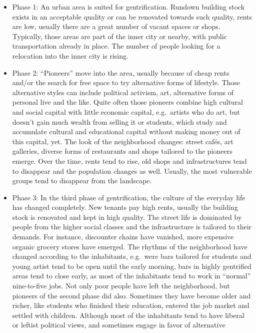 \documentclass[a4paper,
fontsize=11pt,
oneside,
numbers=noperiodatend,
parskip=half-,
bibliography=totoc,
final
]{scrartcl}
\begin{document}
\begin{itemize}
\item
  Phase 1: An urban area is suited for gentrification. Rundown building
  stock exists in an acceptable quality or can be renovated towards such
  quality, rents are low, usually there are a great number of vacant
  spaces or shops. Typically, those areas are part of the inner city or
  nearby, with public transportation already in place. The number of
  people looking for a relocation into the inner city is rising.
\item
  Phase 2: \enquote{Pioneers} move into the area, usually because of
  cheap rents and/or the search for free space to try alternative forms
  of lifestyle. Those alternative styles can include political activism,
  art, alternative forms of personal live and the like. Quite often
  those pioneers combine high cultural and social capital with little
  economic capital, e.g.~artists who do art, but doesn't gain much
  wealth from selling it or students, which study and accumulate
  cultural and educational capital without making money out of this
  capital, yet. The look of the neighborhood changes: street cafés, art
  galleries, diverse forms of restaurants and shops tailored to the
  pioneers emerge. Over the time, rents tend to rise, old shops and
  infrastructures tend to disappear and the population changes as well.
  Usually, the most vulnerable groups tend to disappear from the
  landscape.
\item
  Phase 3: In the third phase of gentrification, the culture of the
  everyday life has changed completely. New tenants pay high rents,
  usually the building stock is renovated and kept in high quality. The
  street life is dominated by people from the higher social classes and
  the infrastructure is tailored to their demands. For instance,
  discounter chains have vanished, more expensive organic grocery stores
  have emerged. The rhythms of the neighborhood have changed according
  to the inhabitants, e.g.~were bars tailored for students and young
  artist tend to be open until the early morning, bars in highly
  gentrified areas tend to close early, as most of the inhabitants tend
  to work in \enquote{normal} nine-to-five jobs. Not only poor people
  have left the neighborhood, but pioneers of the second phase did also.
  Sometimes they have become older and richer, like students who
  finished their education, entered the job market and settled with
  children. Although most of the inhabitants tend to have liberal or
  leftist political views, and sometimes engage in favor of alternative

\end{itemize}
\end{document}
